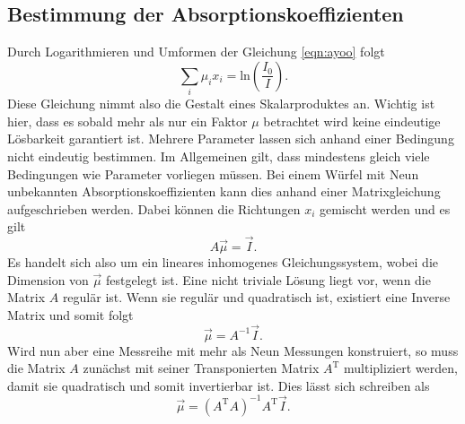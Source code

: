 \subsection{Bestimmung der Absorptionskoeffizienten}
Durch Logarithmieren und Umformen der Gleichung \eqref{eqn:ayoo} folgt
\begin{equation}
\sum_{i}^{} \mu_i x_i = \text{ln}\left(\frac{I_0}{I}\right).
\end{equation}
Diese Gleichung nimmt also die Gestalt eines Skalarproduktes an. Wichtig ist hier, dass es sobald mehr als nur ein Faktor $\mu$ betrachtet wird keine eindeutige Lösbarkeit garantiert ist. Mehrere Parameter lassen sich anhand einer Bedingung
nicht eindeutig bestimmen. Im Allgemeinen gilt, dass mindestens gleich viele Bedingungen wie Parameter vorliegen müssen. Bei einem Würfel mit Neun unbekannten Absorptionskoeffizienten kann dies anhand einer Matrixgleichung aufgeschrieben werden.
Dabei können die Richtungen $x_i$ gemischt werden und es gilt
\begin{equation}
A \vec{\mu} = \vec{I}.
\end{equation}
Es handelt sich also um ein lineares inhomogenes Gleichungssystem, wobei die Dimension von $\vec{\mu}$ festgelegt ist. Eine nicht triviale Lösung liegt vor, wenn die Matrix $A$ regulär ist. Wenn sie regulär und quadratisch ist, existiert
eine Inverse Matrix und somit folgt
\begin{equation}
\vec{\mu} = A^{-1}\vec{I}.
\end{equation}
Wird nun aber eine Messreihe mit mehr als Neun Messungen konstruiert, so muss die Matrix $A$ zunächst mit seiner Transponierten Matrix $A^{\text{T}}$ multipliziert werden, damit sie quadratisch und somit invertierbar ist. 
Dies lässt sich schreiben als 
\begin{equation}
\vec{\mu} = (A^{\text{T}}A)^{-1} A^{\text{T}} \vec{I}.
\end{equation}